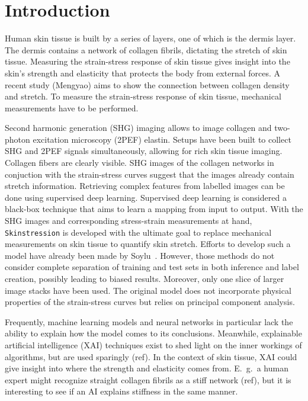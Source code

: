 \chapter{Introduction}

Human skin tissue is built by a series of layers, one of which is the dermis layer.
The dermis contains a network of collagen fibrils, dictating the stretch of skin tissue.
Measuring the strain-stress response of skin tissue gives insight into the skin's strength and elasticity that protects the body from external forces.
A recent study (Mengyao) aims to show the connection between collagen density and stretch.
To measure the strain-stress response of skin tissue, mechanical measurements have to be performed.

Second harmonic generation (SHG) imaging allows to image collagen and two-photon excitation microscopy (2PEF) elastin.
Setups have been built to collect SHG and 2PEF signals simultaneously, allowing for rich skin tissue imaging.
Collagen fibers are clearly visible.
SHG images of the collagen networks in conjuction with the strain-stress curves suggest that the images already contain stretch information.
Retrieving complex features from labelled images can be done using supervised deep learning.
Supervised deep learning is considered a black-box technique that aims to learn a mapping from input to output.
With the SHG images and corresponding stress-strain measurements at hand, \texttt{Skinstression} is developed with the ultimate goal to replace mechanical measurements on skin tissue to quantify skin stretch.
Efforts to develop such a model have already been made by Soylu~\cite{Soylu2022}.
However, those methods do not consider complete separation of training and test sets in both inference and label creation, possibly leading to biased results.
Moreover, only one slice of larger image stacks have been used.
The original model does not incorporate physical properties of the strain-stress curves but relies on principal component analysis.

Frequently, machine learning models and neural networks in particular lack the ability to explain how the model comes to its conclusions.
Meanwhile, explainable artificial intelligence (XAI) techniques exist to shed light on the inner workings of algorithms, but are used sparingly (ref).
In the context of skin tissue, XAI could give insight into where the strength and elasticity comes from.
E.\ g.\ a human expert might recognize straight collagen fibrils as a stiff network (ref), but it is interesting to see if an AI explains stiffness in the same manner.

